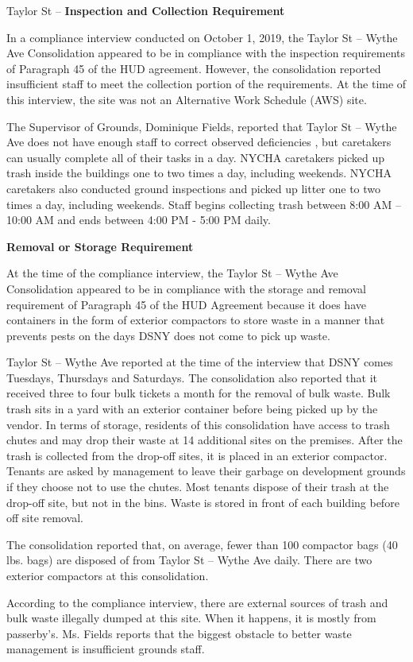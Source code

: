 Taylor St --
\textbf{Inspection and Collection Requirement}

In a compliance interview conducted on October 1, 2019, the Taylor St -- Wythe Ave Consolidation appeared to be in compliance with the inspection requirements of Paragraph 45 of the HUD agreement. However, the consolidation reported insufficient staff to meet the collection portion of the requirements. At the time of this interview, the site was not an Alternative Work Schedule (AWS) site. 

The Supervisor of Grounds, Dominique Fields, reported that Taylor St -- Wythe Ave does not have enough staff to correct observed deficiencies , but caretakers can usually complete all of their tasks in a day. NYCHA caretakers picked up trash inside the buildings one to two times a day, including weekends. NYCHA caretakers also conducted ground inspections and picked up litter one to two times a day, including weekends. Staff begins collecting trash between 8:00 AM -- 10:00 AM and ends between 4:00 PM - 5:00 PM daily. 

\textbf{Removal or Storage Requirement}

At the time of the compliance interview, the Taylor St -- Wythe Ave Consolidation appeared to be in compliance with the storage and removal requirement of Paragraph 45 of the HUD Agreement because it does have containers in the form of exterior compactors to store waste in a manner that prevents pests on the days DSNY does not come to pick up waste. 

Taylor St -- Wythe Ave reported at the time of the interview that DSNY comes Tuesdays, Thursdays and Saturdays. The consolidation also reported that it received three to four bulk tickets a month for the removal of bulk waste. Bulk trash sits in a yard with an exterior container before being picked up by the vendor. In terms of storage, residents of this consolidation have access to trash chutes and may drop their waste at 14 additional sites on the premises. After the trash is collected from the drop-off sites, it is placed in an exterior compactor. Tenants are asked by management to leave their garbage on development grounds if they choose not to use the chutes. Most tenants dispose of their trash at the drop-off site, but not in the bins. Waste is stored in front of each building before off site removal. 

The consolidation reported that, on average, fewer than 100 compactor bags (40 lbs. bags) are disposed of from Taylor St -- Wythe Ave daily. There are two exterior compactors at this consolidation.

According to the compliance interview, there are external sources of trash and bulk waste illegally dumped at this site. When it happens, it is mostly from passerby's. Ms. Fields reports that the biggest obstacle to better waste management is insufficient grounds staff.